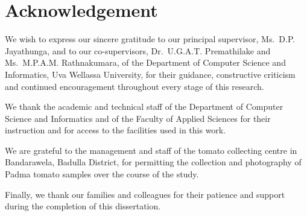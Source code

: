 \section*{Acknowledgement}

We wish to express our sincere gratitude to our principal supervisor, Ms.\ D.P. Jayathunga, and to our co-supervisors, Dr.\ U.G.A.T. Premathilake and Ms.\ M.P.A.M. Rathnakumara, of the Department of Computer Science and Informatics, Uva Wellassa University, for their guidance, constructive criticism and continued encouragement throughout every stage of this research.

We thank the academic and technical staff of the Department of Computer Science and Informatics and of the Faculty of Applied Sciences for their instruction and for access to the facilities used in this work.

We are grateful to the management and staff of the tomato collecting centre in Bandarawela, Badulla District, for permitting the collection and photography of Padma tomato samples over the course of the study.

Finally, we thank our families and colleagues for their patience and support during the completion of this dissertation.

\clearpage
